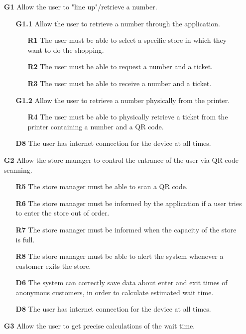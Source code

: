 \begin{enumerate}
	\item [\textbf{G1}] Allow the user to "line up"/retrieve a number.
	\begin{enumerate}
		\item [\textbf{G1.1}] Allow the user to retrieve a number through the application.
		\begin{enumerate}
			\item [\textbf{R1}] The user must be able to select a specific store in which they want to do the shopping.
			\item [\textbf{R2}] The user must be able to request a number and a ticket.
			\item [\textbf{R3}] The user must be able to receive a number and a ticket.
		\end{enumerate}
		\item [\textbf{G1.2}] Allow the user to retrieve a number physically from the printer.
		\begin{enumerate}
			\item [\textbf{R4}] The user must be able to physically retrieve a ticket from the printer containing a number and a QR code.		
		\end{enumerate}
		\item [\textbf{D8}] The user has internet connection for the device at all times.
	\end{enumerate}
	\item [\textbf{G2}] Allow the store manager to control the entrance of the user via QR code scanning.
	\begin{enumerate}
		\item [\textbf{R5}] The store manager must be able to scan a QR code.
		\item [\textbf{R6}] The store manager must be informed by the application if a user tries to enter the store out of order.
		\item [\textbf{R7}] The store manager must be informed when the capacity of the store is full.
		\item [\textbf{R8}] The store manager must be able to alert the system whenever a customer exits the store.
		\item [\textbf{D6}] The system can correctly save data about enter and exit times of anonymous customers, in order to calculate estimated wait time.
		\item [\textbf{D8}] The user has internet connection for the device at all times.
	\end{enumerate}
	\item [\textbf{G3}] Allow the user to get precise calculations of the wait time.

\end{enumerate}
